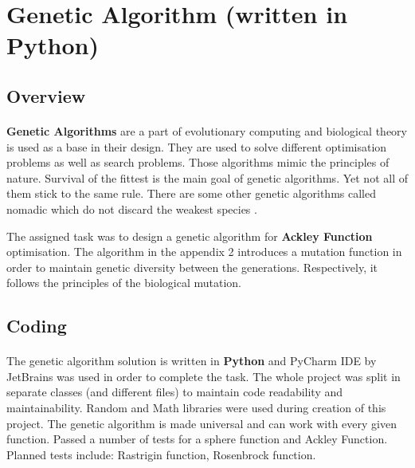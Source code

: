 \documentclass[12pt]{report}
\begin{document}
\paragraph{}


\clearpage

\section*{Genetic Algorithm (written in Python)}

\subsection*{Overview}
\paragraph{}

\textbf{Genetic Algorithms} are a part of evolutionary computing and biological theory is used as a base in their design. They are used to solve different optimisation problems as well as search problems.
Those algorithms mimic the principles of nature. Survival of the fittest is the main goal of genetic algorithms. Yet not all of them stick to the same rule. There are some other genetic algorithms called nomadic
which do not discard the weakest species \citep{GeneticAlgorithmArticle1}.

The assigned task was to design a genetic algorithm for \textbf{Ackley Function} optimisation. The algorithm in the appendix 2 introduces a mutation function
in order to maintain genetic diversity between the generations. Respectively, it follows the principles of the biological mutation.

\subsection*{Coding}
\paragraph{}

The genetic algorithm solution is written in \textbf{Python} and PyCharm IDE by JetBrains was used in order to complete the task.
The whole project was split in separate classes (and different files) to maintain code readability and maintainability.
Random and Math libraries were used during creation of this project. The genetic algorithm is made universal and can work with
every given function. Passed a number of tests for a sphere function and Ackley Function. Planned tests include: Rastrigin function, 
Rosenbrock function.
\end{document}
